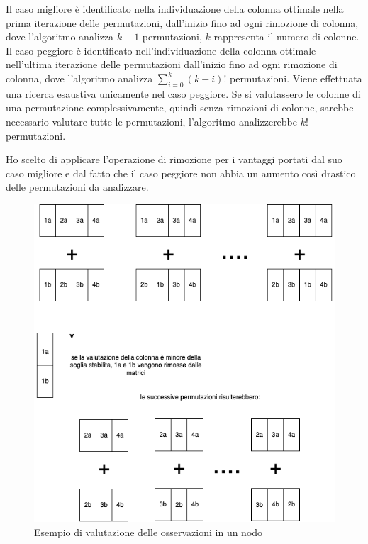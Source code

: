\documentclass[a4paper,12pt]{report}
\begin{document}
    Il caso migliore è identificato nella individuazione della colonna ottimale nella prima iterazione delle permutazioni, dall'inizio fino ad ogni rimozione di colonna, dove l'algoritmo analizza $k-1$ permutazioni, $k$ rappresenta il numero di colonne. Il caso peggiore è identificato nell'individuazione della colonna ottimale nell'ultima iterazione delle permutazioni dall'inizio fino ad ogni rimozione di colonna, dove l'algoritmo analizza  $\sum_{i=0}^k (k-i)!$ permutazioni.
    Viene effettuata una ricerca esaustiva unicamente nel caso peggiore.
    Se si valutassero le colonne di una permutazione complessivamente, quindi senza rimozioni di colonne, sarebbe necessario valutare tutte le permutazioni, l'algoritmo analizzerebbe $k!$ permutazioni.

    Ho scelto di applicare l'operazione di rimozione per i vantaggi portati dal suo caso migliore e dal fatto che il caso peggiore non abbia un aumento così drastico delle permutazioni da analizzare.

    \begin{figure}[H]
      \centering
      \includegraphics[scale=0.80]{img/utility/esempioNodo.drawio.png}
      \caption{Esempio di valutazione delle osservazioni in un nodo}
      \label{fig:esempioNodo}
    \end{figure}
\end{document}
